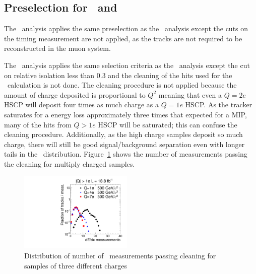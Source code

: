\subsection{Preselection for \tkonly\ and \multi\ \label{sec:otherpreselection}}

The \tkonly\ analysis applies the same preselection as the \tktof\ analysis except the cuts on the timing measurement are not applied, as the tracks
are not required to be reconstructed in the muon system. 

The \multi\ analysis applies
the same selection criteria as the \tktof\ analysis except the cut on relative isolation less than 0.3 and the cleaning of the hits used for the \dedx\ calculation
is not done. The cleaning procedure is not applied because the amount of charge deposited is proportional to $Q^2$ meaning that even a $Q=2e$ HSCP will
deposit four times as much charge as a $Q=1e$ HSCP. As the tracker saturates for a energy loss approximately three times that expected for a MIP, many of the hits from $Q>1e$ HSCP
will be saturated; this can confuse the cleaning procedure. Additionally, as the high charge samples deposit so much charge, 
there will still be good signal/background separation even with longer tails in the \dedx\ distribution.
Figure~\ref{fig:Multi} shows the number of measurements passing the cleaning for multiply charged samples.

\begin{figure}
\centering
  \includegraphics[clip=false, trim=0.0cm 0cm 0.0cm 0cm, width=0.48\textwidth]{figures/multi/Selection_Comp_8TeV_DY_QG_NOM_BS}
  \caption{Distribution of number of \dedx\ measurements passing cleaning for samples of three different charges
    \label{fig:Multi}}
\end{figure}

